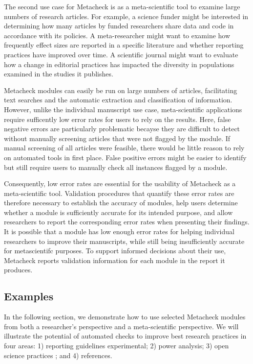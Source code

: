 \documentclass[
  letterpaper,
  12pt]{article}
\begin{document}
The second use case for Metacheck is as a meta-scientific tool to
examine large numbers of research articles. For example, a science
funder might be interested in determining how many articles by funded
researchers share data and code in accordance with its policies. A
meta-researcher might want to examine how frequently effect sizes are
reported in a specific literature and whether reporting practices have
improved over time. A scientific journal might want to evaluate how a
change in editorial practices has impacted the diversity in populations
examined in the studies it publishes.

Metacheck modules can easily be run on large numbers of articles,
facilitating text searches and the automatic extraction and
classification of information. However, unlike the individual manuscript
use case, meta-scientific applications require sufficently low error
rates for users to rely on the results. Here, false negative errors are
particularly problematic becayse they are difficult to detect without
manually screening articles that were not flagged by the module. If
manual screening of all articles were feasible, there would be little
reason to rely on automated tools in first place. False positive errors
might be easier to identify but still require users to manually check
all instances flagged by a module.

Consequently, low error rates are essential for the usability of
Metacheck as a meta-scientific tool. Validation procedures that quantify
these error rates are therefore necessary to establish the accuracy of
modules, help users determine whether a module is sufficiently accurate
for its intended purpose, and allow researchers to report the
corresponding error rates when presenting their findings. It is possible
that a module has low enough error rates for helping individual
researchers to improve their manuscripts, while still being
insufficiently accurate for metascientifc purposes. To support informed
decisions about their use, Metacheck reports validation information for
each module in the report it produces.

\subsection{Examples}\label{examples}

In the following section, we demonstrate how to use selected Metacheck
modules from both a researcher's perspective and a meta-scientific
perspective. We will illustrate the potential of automated checks to
improve best research practices in four areas: 1) reporting guidelines
experimental; 2) power analysis; 3) open science practices ; and 4)
references.
\end{document}
